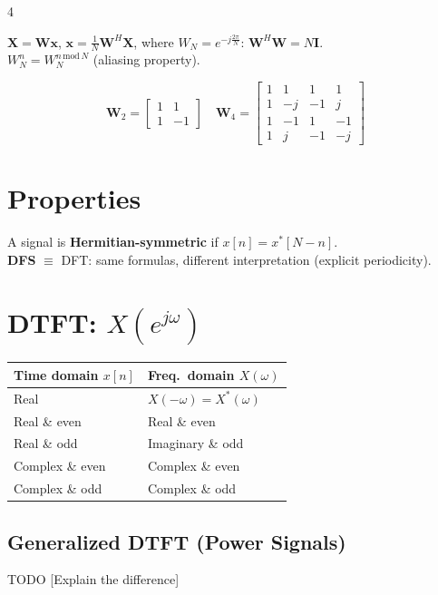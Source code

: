 \documentclass[8pt,a4paper,landscape]{extarticle}
\begin{document}
\begin{multicols*}{4}
\begin{prop}[title=DFT matrix form]
$\mathbf{X} = \mathbf{W}\mathbf{x}$, \quad $\mathbf{x} = \tfrac{1}{N}\mathbf{W}^H\mathbf{X}$, where $W_N = e^{-j\frac{2\pi}{N}}$:
$\mathbf{W}^H\mathbf{W} = N\mathbf{I}$.\\
$W_N^n = W_N^{n\,\mathrm{mod}\,N}$ (aliasing property).
\end{prop}

\[
  \mathbf{W}_2 = \begin{bmatrix}1&1\\1&-1\end{bmatrix} \quad
  \mathbf{W}_4 = \begin{bmatrix}1&1&1&1\\1&-j&-1&j\\1&-1&1&-1\\1&j&-1&-j\end{bmatrix}
\]

\section{Properties}
A signal is \textbf{Hermitian-symmetric} if $x[n]=x^*[N-n]$.\\
\textbf{DFS} $\equiv$ DFT: same formulas, different interpretation (explicit periodicity).

\section{DTFT: $X(e^{j\omega})$}

\begin{thm}[title=Symmetry summary]
\renewcommand{\arraystretch}{1}
\begin{tabularx}{\linewidth}{@{}XX@{}}
\toprule
\textbf{Time domain} $x[n]$ & \textbf{Freq.\ domain} $X(\omega)$ \\
\midrule
Real & $X(-\omega)=X^*(\omega)$ \\
Real \& even & Real \& even \\
Real \& odd & Imaginary \& odd \\
Complex \& even & Complex \& even \\
Complex \& odd & Complex \& odd \\
\bottomrule
\end{tabularx}
\end{thm}

\subsection{Generalized DTFT (Power Signals)}
TODO [Explain the difference]


\end{multicols*}
\end{document}
